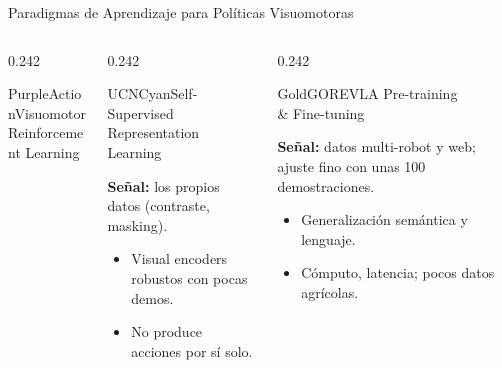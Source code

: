 \documentclass[aspectratio=169,10pt,xcolor={dvipsnames,table}]{beamer}
\newcommand{\FootnoteFont}{\fontsize{5}{6.2}\selectfont}                %
\newcommand{\CheckMark}{\textcolor{AgriGreen}{$\checkmark$}}
\newcommand{\CrossMark}{\textcolor{AlertRed}{$\times$}}
\newcommand{\RefNote}[1]{{\FootnoteFont\textcolor{TextDark!65}{\cite{#1}}}}
\begin{document}
\begin{frame}{Paradigmas de Aprendizaje para Políticas Visuomotoras}
\begin{columns}[T, onlytextwidth]
\begin{column}{0.242\textwidth}
\begin{Card}[height=34mm, left=1.1mm, right=1.1mm]{PurpleAction}{\fontsize{6.2}{7.2}\selectfont Visuomotor\\Reinforcement Learning}
      \end{Card}
    \end{column}
    \begin{column}{0.242\textwidth}
      \begin{Card}[height=34mm, left=1.1mm, right=1.1mm]{UCNCyan}{\fontsize{6.2}{7.2}\selectfont Self-Supervised\\Representation Learning}
        {\fontsize{5.2}{6.3}\selectfont\raggedright
        \textbf{Señal:} los propios datos (contraste, masking).\par
        \begin{itemize}\setlength{\itemsep}{0.4pt}
          \item[\CheckMark] Visual encoders robustos con pocas demos.
          \item[\CrossMark] No produce acciones por sí solo.
        \end{itemize}
        \RefNote{laskin2020curl,nair2022r3m,radosavovic2022mvp,oquab2024dinov2}\par}
      \end{Card}
    \end{column}
    \begin{column}{0.242\textwidth}
      \begin{Card}[height=34mm, left=1.1mm, right=1.1mm]{GoldGORE}{\fontsize{6.2}{7.2}\selectfont VLA Pre-training\\\& Fine-tuning}
        {\fontsize{5.2}{6.3}\selectfont\raggedright
        \textbf{Señal:} datos multi-robot y web; ajuste fino con unas 100 demostraciones.\par
        \begin{itemize}\setlength{\itemsep}{0.4pt}
          \item[\CheckMark] Generalización semántica y lenguaje.
          \item[\CrossMark] Cómputo, latencia; pocos datos agrícolas.
        \end{itemize}
        \RefNote{brohan2023rt2,kim2024openvla,octo2024octo}\par}
      \end{Card}
    \end{column}
  \end{columns}
  \vspace{1.6mm}
  \centering
\end{frame}
\end{document}
